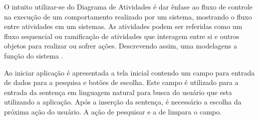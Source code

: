 O intuito utilizar-se do Diagrama de Atividades é dar ênfase ao fluxo de controle na execução de um comportamento realizado por um sistema, mostrando o fluxo entre atividades em um sistemas. As atividades podem ser referidas como um fluxo sequencial ou ramificação de atividades que interagem entre si e outros objetos para realizar ou sofrer ações. Descrevendo assim, uma modelagens a função do sistema \cite{Booch:2012}.  

Ao iniciar aplicação é apresentada a tela inicial contendo um campo para entrada de dados para a pesquisa e botões de escolha. Este campo é utilizado para a entrada da sentença em linguagem natural para busca do usuário que esta utilizando a aplicação. Após a inserção da sentença, é necessário a escolha da próxima ação do usuário. A ação de pesquisar e a de limpara o campo.
